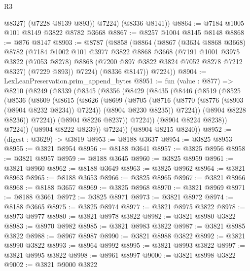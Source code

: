 \begin{lexlean}{R3}
\begin{coremodule}
            @8327)
          (@7228 @8139 @893))
        @7224)
      (@8336 @8141))
@8864 := @7184 @1005 @101 @8149 @3822 @8782 @3668
@8867 := @8257 @1004 @8145 @8148
@8868 := @876 @8147
@8903 := @8787
    (@8858
      (@8864
        (@8867
          (@3634 @8868 @3668)
          @8782
          (@7184
            @1002
            @101
            @3977
            @3822
            @8868
            @3668
            (@7191
              @1001
              @3975
              @3822
              (@7053 @8278)
              @8868
              (@7200 @897 @3822 @3824 @7052 @8278 @7212 @8327)
              (@7229 @893))
            @7224)
          (@8336 @8147))
        @7224))
@8904 := LexLeanPreservation.prim_append_bytes
@8951 := fun (value : @877) =>
  @8210
    (@8249
      (@8339
        (@8345
          (@8356
            (@8429
              (@8435
                (@8446
                  (@8519
                    (@8525
                      (@8536
                        (@8609
                          (@8615
                            (@8626
                              (@8699
                                (@8705
                                  (@8716
                                    (@8770 (@8776 (@8903 (@8904 @8232 @8234)) @7224))
                                    (@8904 @8230 @8235))
                                  @7224))
                              (@8904 @8228 @8236))
                            @7224))
                        (@8904 @8226 @8237))
                      @7224))
                  (@8904 @8224 @8238))
                @7224))
            (@8904 @8222 @8239))
          @7224))
      (@8904 @8215 @8240))
@8952 := (digest : @3629) -> @3819
@8953 := @8188 @3637
@8954 := @3825 @8953
@8955 := @3821 @8954
@8956 := @8188 @3641
@8957 := @3825 @8956
@8958 := @3821 @8957
@8959 := @8188 @3645
@8960 := @3825 @8959
@8961 := @3821 @8960
@8962 := @8188 @3649
@8963 := @3825 @8962
@8964 := @3821 @8963
@8965 := @8188 @3653
@8966 := @3825 @8965
@8967 := @3821 @8966
@8968 := @8188 @3657
@8969 := @3825 @8968
@8970 := @3821 @8969
@8971 := @8188 @3661
@8972 := @3825 @8971
@8973 := @3821 @8972
@8974 := @8188 @3665
@8975 := @3825 @8974
@8977 := @3821 @8975 @3822
@8978 := @8973 @8977
@8980 := @3821 @8978 @3822
@8982 := @3821 @8980 @3822
@8983 := @8970 @8982
@8985 := @3821 @8983 @3822
@8987 := @3821 @8985 @3822
@8988 := @8967 @8987
@8990 := @3821 @8988 @3822
@8992 := @3821 @8990 @3822
@8993 := @8964 @8992
@8995 := @3821 @8993 @3822
@8997 := @3821 @8995 @3822
@8998 := @8961 @8997
@9000 := @3821 @8998 @3822
@9002 := @3821 @9000 @3822

\end{coremodule}
\end{lexlean}
